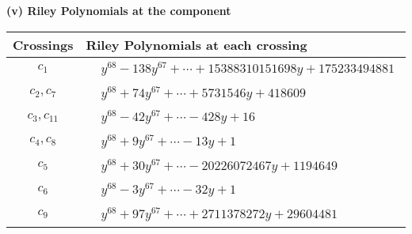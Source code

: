 \documentclass[1p]{elsarticle_modified}
\theoremstyle{definition}
\begin{document}
\newpage\renewcommand{\arraystretch}{1}
\flushleft \textbf{(v) Riley Polynomials at the component}\newline \\
\begin{tabular}{m{50pt}|m{274pt}}
Crossings & \hspace{64pt}Riley Polynomials at each crossing \\
\hline $$\begin{aligned}c_{1}\end{aligned}$$&$\begin{aligned}
&y^{68}-138 y^{67}+\cdots+15388310151698 y+175233494881
\end{aligned}$\\
\hline $$\begin{aligned}c_{2},c_{7}\end{aligned}$$&$\begin{aligned}
&y^{68}+74 y^{67}+\cdots+5731546 y+418609
\end{aligned}$\\
\hline $$\begin{aligned}c_{3},c_{11}\end{aligned}$$&$\begin{aligned}
&y^{68}-42 y^{67}+\cdots-428 y+16
\end{aligned}$\\
\hline $$\begin{aligned}c_{4},c_{8}\end{aligned}$$&$\begin{aligned}
&y^{68}+9 y^{67}+\cdots-13 y+1
\end{aligned}$\\
\hline $$\begin{aligned}c_{5}\end{aligned}$$&$\begin{aligned}
&y^{68}+30 y^{67}+\cdots-20226072467 y+1194649
\end{aligned}$\\
\hline $$\begin{aligned}c_{6}\end{aligned}$$&$\begin{aligned}
&y^{68}-3 y^{67}+\cdots-32 y+1
\end{aligned}$\\
\hline $$\begin{aligned}c_{9}\end{aligned}$$&$\begin{aligned}
&y^{68}+97 y^{67}+\cdots+2711378272 y+29604481
\end{aligned}$\\

\end{tabular}
\end{document}
